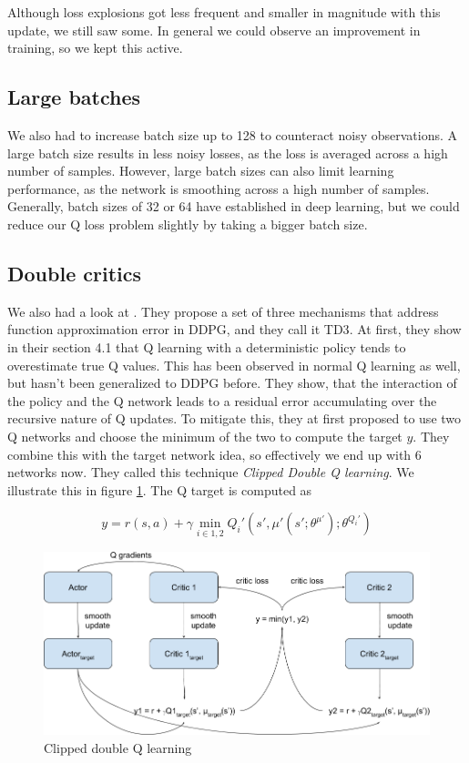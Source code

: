 \documentclass[hyperref,final,beleg]{cgvpub}
\begin{document}
Although loss explosions got less frequent and smaller in magnitude with this update, we still saw some. In general we could observe an improvement in training, so we kept this active.

\subsection{Large batches}
We also had to increase batch size up to 128 to counteract noisy observations. A large batch size results in less noisy losses, as the loss is averaged across a high number of samples. However, large batch sizes can also limit learning performance, as the network is smoothing across a high number of samples. Generally, batch sizes of 32 or 64 have established in deep learning, but we could reduce our Q loss problem slightly by taking a bigger batch size.

\subsection{Double critics}
\label{sec:double_critics}

We also had a look at \cite{fujimotoAddressingFunctionApproximation2018}. They propose a set of three mechanisms that address function approximation error in \ac{DDPG}, and they call it \ac{TD3}. At first, they show in their section 4.1 that Q learning with a deterministic policy tends to overestimate true Q values. This has been observed in normal Q learning as well, but hasn't been generalized to \ac{DDPG} before. They show, that the interaction of the policy and the Q network leads to a residual error accumulating over the recursive nature of Q updates. To mitigate this, they at first proposed to use two Q networks and choose the minimum of the two to compute the target $y$. They combine this with the target network idea, so effectively we end up with 6 networks now. They called this technique \textit{Clipped Double Q learning}. We illustrate this in figure \ref{fig:clippedq}. The Q target is computed as 

\begin{equation}
y = r(s, a) + \gamma \min_{i \in {1,2}} Q_i'(s', \mu'(s';\theta^{\mu'});\theta^{Q_i'})
\end{equation}

\begin{figure}
  \centering
  \includegraphics[width=0.7\linewidth]{images/TD3-Setup.png}
  \caption{Clipped double Q learning}
  \label{fig:clippedq}
\end{figure}
\end{document}
